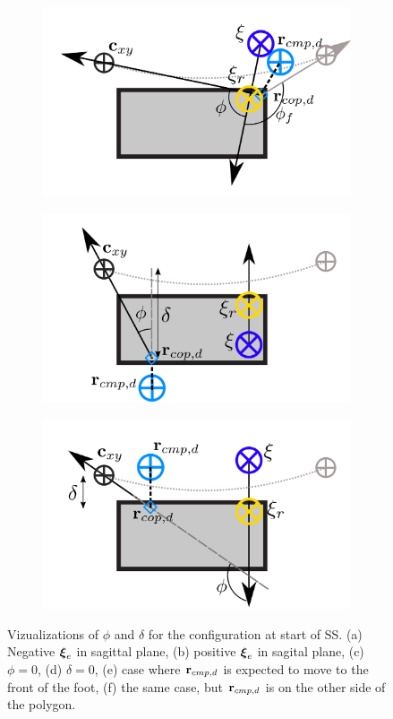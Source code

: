 \begin{figure}[h]
\begin{subfigure}{0.4\textwidth}
    \caption{}
     \label{fig:phiVizc}
  \end{subfigure}
  \begin{subfigure}{0.4\textwidth}
    \centering
  \includegraphics[width=.8\linewidth]{STYLESTUFF/ICPplanStartSSPhiViz90.png}
    \caption{}
     \label{fig:phiVizd}
  \end{subfigure}
    \begin{subfigure}{0.4\textwidth}
    \centering
  \includegraphics[width=.8\linewidth]{STYLESTUFF/ICPplanStartSSPhiVizLeftError.png}
    \caption{}
     \label{fig:phiVize}
  \end{subfigure}
  \begin{subfigure}{0.4\textwidth}
    \centering
  \includegraphics[width=.8\linewidth]{STYLESTUFF/ICPplanStartSSPhiVizRightError.png}
    \caption{}
     \label{fig:phiVizf}
  \end{subfigure}
  \caption{Vizualizations of $\phi$ and $\delta$ for the configuration at start of \ac{SS}. (a) Negative $\boldsymbol{\xi}_e$ in sagittal plane, (b) positive $\boldsymbol{\xi}_e$ in sagital plane, (c) $\phi=0$, (d) $\delta=0$, (e) case where $\mathbf{r}_{cmp,d}$ is expected to move to the front of the foot, (f) the same case, but $\mathbf{r}_{cmp,d}$ is on the other side of the polygon.}
  \label{fig:phiViz}
\end{figure}

